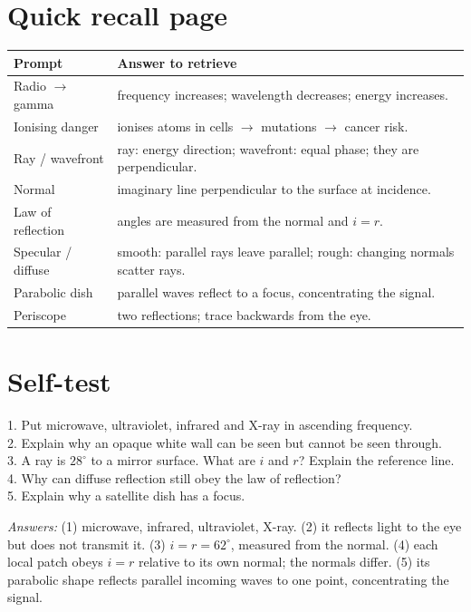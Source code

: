\documentclass[10pt,a4paper]{article}
\begin{document}
\section*{Quick recall page}
\begin{tabularx}{\linewidth}{@{}p{.34\linewidth}X@{}}\toprule
Prompt & Answer to retrieve\\\midrule
Radio $\rightarrow$ gamma & frequency increases; wavelength decreases; energy increases.\\
Ionising danger & ionises atoms in cells $\rightarrow$ mutations $\rightarrow$ cancer risk.\\
Ray / wavefront & ray: energy direction; wavefront: equal phase; they are perpendicular.\\
Normal & imaginary line perpendicular to the surface at incidence.\\
Law of reflection & angles are measured from the normal and $i=r$.\\
Specular / diffuse & smooth: parallel rays leave parallel; rough: changing normals scatter rays.\\
Parabolic dish & parallel waves reflect to a focus, concentrating the signal.\\
Periscope & two reflections; trace backwards from the eye.\\\bottomrule
\end{tabularx}

\section*{Self-test}
1. Put microwave, ultraviolet, infrared and X-ray in ascending frequency.\\
2. Explain why an opaque white wall can be seen but cannot be seen through.\\
3. A ray is $28^\circ$ to a mirror surface. What are $i$ and $r$? Explain the reference line.\\
4. Why can diffuse reflection still obey the law of reflection?\\
5. Explain why a satellite dish has a focus.

\textit{Answers:} (1) microwave, infrared, ultraviolet, X-ray. (2) it reflects light to the eye but does not transmit it. (3) $i=r=62^\circ$, measured from the normal. (4) each local patch obeys $i=r$ relative to its own normal; the normals differ. (5) its parabolic shape reflects parallel incoming waves to one point, concentrating the signal.
\end{document}
